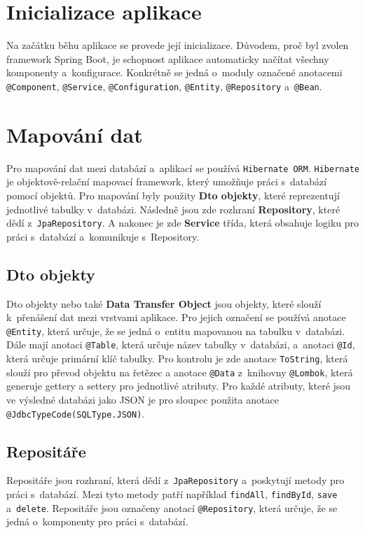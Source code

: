 \newpage

\section{Inicializace aplikace}
Na začátku běhu aplikace se provede její inicializace.
Důvodem, proč byl zvolen framework Spring Boot, je schopnost aplikace automaticky
načítat všechny komponenty a~konfigurace.
Konkrétně se jedná o~moduly označené anotacemi \texttt{@Component}, \texttt{@Service},
\texttt{@Configuration}, \texttt{@Entity}, \texttt{@Repository} a~\texttt{@Bean}.

\section{Mapování dat}
\label{sec:mapovaniDat}
Pro mapování dat mezi databází a~aplikací se používá \texttt{Hibernate ORM}.
\texttt{Hibernate} je objektově-relační mapovací framework, který umožňuje práci s~databází pomocí objektů.
Pro mapování byly použity \textbf{Dto objekty}, které reprezentují jednotlivé tabulky v~databázi.
Následně jsou zde rozhraní \textbf{Repository}, které dědí z~\texttt{JpaRepository}.
A nakonec je zde \textbf{Service} třída, která obsahuje logiku pro práci s~databází a~komunikuje s~Repository.

\subsection{Dto objekty}
Dto objekty nebo také \textbf{Data Transfer Object} jsou objekty, které slouží k~přenášení dat mezi vrstvami aplikace.
Pro jejich označení se používá anotace \texttt{@Entity}, která určuje, že se jedná o~entitu mapovanou na tabulku v~databázi.
Dále mají anotaci \texttt{@Table}, která určuje název tabulky v~databázi, a~anotaci \texttt{@Id}, která určuje primární klíč tabulky.
Pro kontrolu je zde anotace \texttt{ToString}, která slouží pro převod objektu na řetězec a anotace \texttt{@Data} 
z~knihovny \texttt{@Lombok}, která generuje gettery a settery pro jednotlivé atributy.
Pro každé atributy, které jsou ve výsledné databázi jako JSON je pro sloupec použita anotace \texttt{@JdbcTypeCode(SQLType.JSON)}.

\subsection{Repositáře}
Repositáře jsou rozhraní, která dědí z~\texttt{JpaRepository} a~poskytují metody pro práci s~databází.
Mezi tyto metody patří například \texttt{findAll}, \texttt{findById}, \texttt{save} a~\texttt{delete}.
Repositáře jsou označeny anotací \texttt{@Repository}, která určuje, že se jedná o~komponenty pro práci s~databází.

